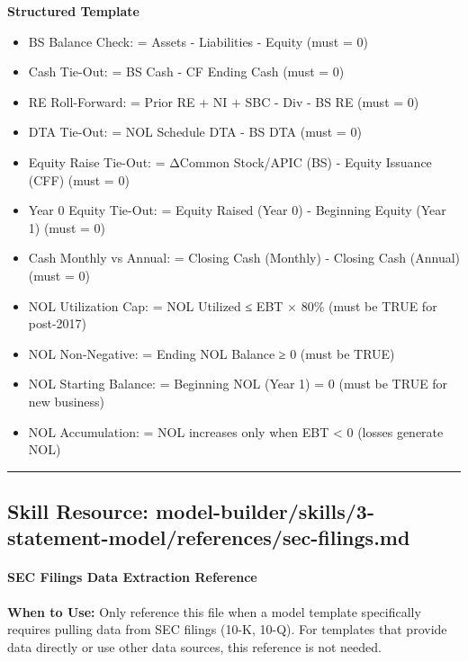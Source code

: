 \documentclass[11pt]{article}
\begin{document}
\textbf{Structured Template}
\begin{itemize}[leftmargin=*,itemsep=2pt,topsep=2pt]
\item {} BS Balance Check: = Assets - Liabilities - Equity (must = 0)
\item {} Cash Tie-Out: = BS Cash - CF Ending Cash (must = 0)
\item {} RE Roll-Forward: = Prior RE + NI + SBC - Div - BS RE (must = 0)
\item {} DTA Tie-Out: = NOL Schedule DTA - BS DTA (must = 0)
\item {} Equity Raise Tie-Out: = ΔCommon Stock/APIC (BS) - Equity Issuance (CFF) (must = 0)
\item {} Year 0 Equity Tie-Out: = Equity Raised (Year 0) - Beginning Equity (Year 1) (must = 0)
\item {} Cash Monthly vs Annual: = Closing Cash (Monthly) - Closing Cash (Annual) (must = 0)
\item {} NOL Utilization Cap: = NOL Utilized ≤ EBT × 80\% (must be TRUE for post-2017)
\item {} NOL Non-Negative: = Ending NOL Balance ≥ 0 (must be TRUE)
\item {} NOL Starting Balance: = Beginning NOL (Year 1) = 0 (must be TRUE for new business)
\item {} NOL Accumulation: = NOL increases only when EBT < 0 (losses generate NOL)
\end{itemize}

\vspace{0.8em}\hrule\vspace{0.8em}

\subsection{Skill Resource: model-builder/skills/3-statement-model/references/sec-filings.md}\label{file:model-builder-skills-3-statement-model-references-sec-filings-md}

\paragraph{SEC Filings Data Extraction Reference}\mbox{}\par

\textbf{When to Use:} Only reference this file when a model template specifically requires pulling data from SEC filings (10-K, 10-Q). For templates that provide data directly or use other data sources, this reference is not needed.
\end{document}
